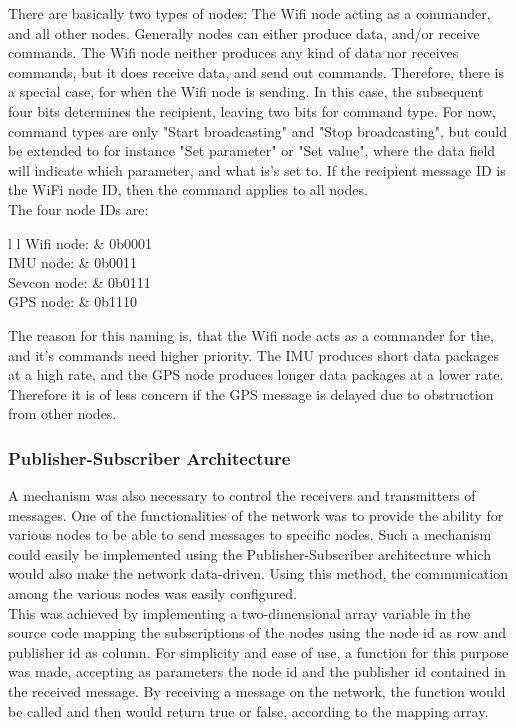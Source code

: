 There are basically two types of nodes: The Wifi node acting as a commander, and all other nodes.
Generally nodes can either produce data, and/or receive commands.
The Wifi node neither produces any kind of data nor receives commands, but it does receive data, and send out commands.
Therefore, there is a special case, for when the Wifi node is sending.
In this case, the subsequent four bits determines the recipient, leaving two bits for command type. 
For now, command types are only "Start broadcasting" and "Stop broadcasting", but could be extended to for instance "Set parameter" or "Set value", where the data field will indicate which parameter, and what is's set to.
If the recipient message ID is the WiFi node ID, then the command applies to all nodes.\\

The four node IDs are:
\begin{table}[h!]
	\begin{tabular}{{l} {l}}
		Wifi node: & 0b0001 \\
		IMU node: & 0b0011 \\
		Sevcon node: & 0b0111 \\
		GPS node: & 0b1110
	\end{tabular}
\end{table}
The reason for this naming is, that the Wifi node acts as a commander for the, and it's commands need higher priority.
The IMU produces short data packages at a high rate, and the GPS node produces longer data packages at a lower rate. 
Therefore it is of less concern if the GPS message is delayed due to obstruction from other nodes. 

\subsubsection{Publisher-Subscriber Architecture}
A mechanism was also necessary to control the receivers and transmitters of messages.
One of the functionalities of the network was to provide the ability for various nodes to be able to send messages to specific nodes.
Such a mechanism could easily be implemented using the Publisher-Subscriber architecture which would also make the network data-driven.
Using this method, the communication among the various nodes was easily configured.
\\
This was achieved by implementing a two-dimensional array variable in the source code mapping the subscriptions of the nodes using the node id as row and publisher id as column.
For simplicity and ease of use, a function for this purpose was made, accepting as parameters the node id and the publisher id contained in the received message.
By receiving a message on the network, the function would be called and then would return true or false, according to the mapping array.
